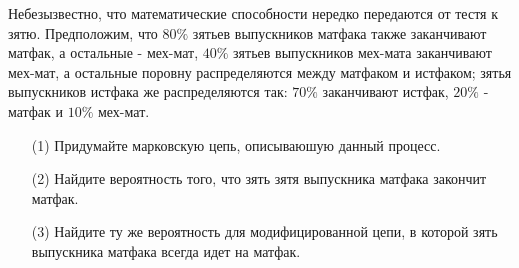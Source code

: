     \begin{prob}
        Небезызвестно, что математические способности нередко передаются от тестя к зятю. Предположим, что $80 \%$ зятьев выпускников матфака также заканчивают матфак, а остальные - мех-мат, $40 \%$ зятьев выпускников мех-мата заканчивают мех-мат, а остальные поровну распределяются между матфаком и истфаком; зятья выпускников истфака же распределяются так: $70 \%$ заканчивают истфак, $20 \%$ - матфак и $10 \%$ мех-мат.
        \begin{itemize}
        \item[(1)] Придумайте марковскую цепь, описываюшую данный процесс.
        \item[(2)] Найдите вероятность того, что зять зятя выпускника матфака закончит матфак.
        \item[(3)] Найдите ту же вероятность для модифицированной цепи, в которой зять выпускника матфака всегда идет на матфак.
        \end{itemize}
    \end{prob}
